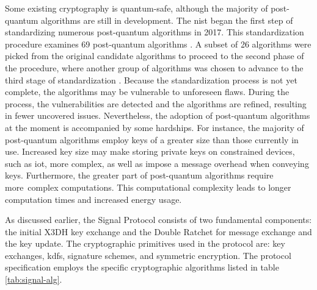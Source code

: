 Some existing cryptography is quantum-safe, although the majority of post-quantum algorithms are still in development. The \gls{nist} began the first step of standardizing numerous post-quantum algorithms in 2017. This standardization procedure examines 69 post-quantum algorithms \cite{chen2016report}. A subset of 26 algorithms were picked from the original candidate algorithms to proceed to the second phase of the procedure, where another group of algorithms was chosen to advance to the third stage of standardization \cite{alagic2020status}. Because the standardization process is not yet complete, the algorithms may be vulnerable to unforeseen flaws. During the process, the vulnerabilities are detected and the algorithms are refined, resulting in fewer uncovered issues. Nevertheless, the adoption of post-quantum algorithms at the moment is accompanied by some hardships. For instance, the majority of post-quantum algorithms employ keys of a greater size than those currently in use. Increased key size may make storing private keys on constrained devices, such as \gls{iot}, more complex, as well as impose a message overhead when conveying keys. Furthermore, the greater part of post-quantum algorithms require more complex computations. This computational complexity leads to longer computation times and increased energy usage. 
\par
As discussed earlier, the Signal Protocol consists of two fundamental components: the initial X3DH key exchange and the Double Ratchet for message exchange and the key update. The cryptographic primitives used in the protocol are: key exchanges, \glspl{kdf}, signature schemes, and symmetric encryption. The protocol specification employs the specific cryptographic algorithms listed in table \ref{tab:signal-alg}.

